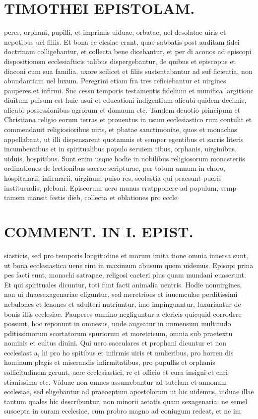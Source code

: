 \documentclass{article}
\begin{document}
\begin{pages}
\section*{TIMOTHEI EPISTOLAM. }
\marginpar{[ p.123 ]}\pstart peres, orphani, pupilli, et imprimis uiduae, orbatae, uel desolatae uiris et nepotibus uel filiis. Et bona ec clesiae erant, quae sabbatis post auditam fidei doctrinam colligebantur, et collecta bene dicebantur, et per di aconos ad episcopi dispositionem ecclesiafticis talibus dispergebantur, de quibus et episcopus et diaconi cum sua familia, uxore scilicet et filiis sustentabantur ad suf ficientia, non abundantiam uel luxum. Peregrini etiam fra tres reficiebantur et uirgines pauperes et infirmi. Suc cessu temporis testamentis fidelium et munifica largitionc diuitum puisum est huic usui et educationi indigentium alicubi quidem decimis, alicubi possessionibus agrorum et domuum etc. Tandem deuotio principum et Christiana religio eorum terras et prouentus in usum ecclesiastico rum contulit et commendauit religiosioribus uiris, et pbatae sanctimoniae, quos et monachos appellabant, ut illi dispensarent quotamnis et semper egentibus et sacris literis incumbentibus et in spiritualibus populo seruiem tibus, orphanis, uirginibus, uiduis, hospitibus. Sunt enim usque hodie in nobilibus religiosorum monasteriis ordinationes de lectionibus sacrae scripturae, per totum annum in choro, hospitalarii, infirmarii, uirginum puiso res, scolastia qui praesunt pueris instituendis, plebani. Episcorum uero munus eratpponere ad populum, semp tamem mansit festis dieb, collecta et oblationes pro cccle  \pend
\section*{COMMENT. IN I. EPIST. }
\marginpar{[ p.124 ]}\pstart siasticis, sed pro temporis longitudine et morum imita tione omnia inuersa sunt, ut bona ecclesiastica uene rint in maximum abusum quem uidemus. Episopi prina pes facti sunt, monachi satrapae, religosi caeteri plus quam mundani euaserunt. Et qui spirituales dicuntur, toti funt facti animalia uentris. Hodie nonuirgines, non ui duaesexagenariae eliguntur, sed meretrioes et iuuemculae perditissimi nebulones et lenones et adulteri nutriuntur, imo impinguantur, luxuriantur de bonis illis ecclesiae. Pauperes omnino negliguntur a clericis quicquid corrodere possunt, hoc reponunt in omnesus, unde augeatur in immensum multitudo pditissimorum scortatorum spuriorum et moretricum, omnia sub praetextu nominis et cultus diuini. Qui uero saeculares et prophani dicuntur et non ecclesiast a, hi pro ho spitibus et infirmis uiris et mulieribus, pro horren dis hominum plagis et miserandis infirmitatibus, pro pupullis et orphanis sollicitudinem gerunt, uere ecclesiastici, re et officio et cura insigni et chri stianissima etc. Viduae non omnes assumebantur ad tutelam et annonam ecclesiae, sed eligebantur ad praeoeptum apostolorum ut hic uidemus, uiduae illae tantum quales hic describuntur, non minorii aetatis quam sexagenaria: ne semel susoepta in curam ecclesiae, cum probro magno ad coniugum redeat, et ne im  \pend

\end{pages}
\end{document}
